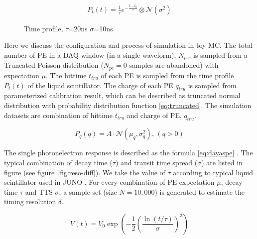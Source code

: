 \begin{minipage}{.4\textwidth}
\begin{align}
    P_{t}(t) = \frac{1}{\tau}e^{-\frac{t - t_{0}}{\tau}} \otimes \mathcal{N}(\sigma^{2})
    \label{eq:time-pro}
\end{align}
\end{minipage}
\begin{minipage}{.6\textwidth}
\begin{figure}[H]
    \centering
    \resizebox{\textwidth}{!}{}
    \caption{\label{fig:time-pro} Time profile, $\tau$=20ns $\sigma$=10ns}
\end{figure}
\end{minipage}

Here we discuss the configuration and process of simulation in toy MC. The total number of PE in a DAQ window (in a single waveform), $N_{pe}$, is sampled from a Truncated Poisson distribution ($N_{pe}=0$ samples are abandoned) with expectation $\mu$. The hittime $t_{tru}$ of each PE is sampled from the time profile $P_{t}(t)$ of the liquid scintillator. The charge of each PE $q_{tru}$ is sampled from parameterized calibration result, which can be described as truncated normal distribution with probability distribution function \eqref{eq:truncated}. The simulation datasets are combination of hittime $t_{tru}$ and charge of PE, $q_{tru}$. 

\begin{equation}
    P_{q}(q) = A\cdot\mathcal{N}(\mu_{q},\sigma_{q}^{2}),\,(q>0)
    \label{eq:truncated}
\end{equation}

The single photonelectron response is described as the formula \eqref{eq:dayaspe} \cite{jetter_pmt_2012}. The typical combination of decay time ($\tau$) and transit time spread ($\sigma$) are listed in figure (see figure~\ref{fig:reso-diff}). We take the value of $\tau$ according to typical liquid scintillator used in JUNO \cite{ludhova_particle_2020}. For every combination of PE expectation $\mu$, decay time $\tau$ and TTS $\sigma$, a sample set (size $N=10,000$) is generated to estimate the timing resolution $\delta$. 

\begin{equation}
    V(t) = V_{0}\exp\left(-\frac{1}{2}\left(\frac{\ln(t/\tau)}{\sigma}\right)^{2}\right)
    \label{eq:dayaspe}
\end{equation}

